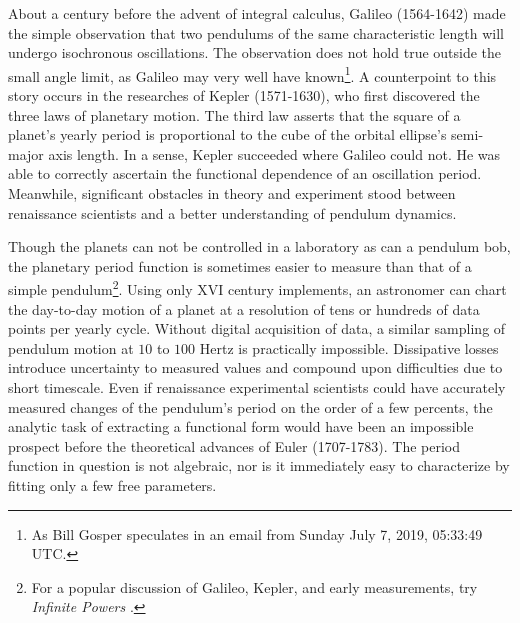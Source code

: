 \documentclass[nofootinbib,preprint]{revtex4-1}
\begin{document}
About a century before the advent of 
integral calculus, Galileo (1564-1642) made the simple observation that two 
pendulums of the same characteristic length will undergo isochronous 
oscillations. The observation does not hold true outside the small angle limit, 
as Galileo may very well have known\footnote{As Bill Gosper speculates
in an email from Sunday July 7, 2019, 05:33:49 UTC.}. A counterpoint to this 
story occurs in the researches of Kepler (1571-1630), who first discovered the three 
laws of planetary motion. The third law asserts that the square of a planet's yearly 
period is proportional to the cube of the orbital ellipse's semi-major axis length. 
In a sense, Kepler succeeded where Galileo could not. He was able to correctly 
ascertain the functional dependence of an oscillation period. Meanwhile, significant 
obstacles in theory and experiment stood between renaissance scientists and a better 
understanding of pendulum dynamics.  

Though the planets can not be controlled in a laboratory as can a pendulum bob, the 
planetary period function is sometimes easier to measure than that of a simple 
pendulum\footnote{For a popular discussion of Galileo, Kepler, and early measurements, 
try \textit{Infinite Powers} \cite{STROGATZ2019}.}. 
Using only XVI century implements, an astronomer can chart the day-to-day motion of a 
planet at a resolution of tens or hundreds of data points per yearly cycle. 
Without digital acquisition of data, a similar sampling of pendulum motion at $10$ to 
$100$ Hertz is practically impossible. Dissipative losses introduce uncertainty to 
measured values and compound upon difficulties due to short timescale. Even if renaissance 
experimental scientists could have accurately measured changes of the pendulum's period on 
the order of a few percents, the analytic task of extracting a functional form would have been 
an impossible prospect before the theoretical advances of Euler (1707-1783). The period 
function in question is not algebraic, nor is it immediately easy to characterize by fitting 
only a few free parameters. 
\end{document}
